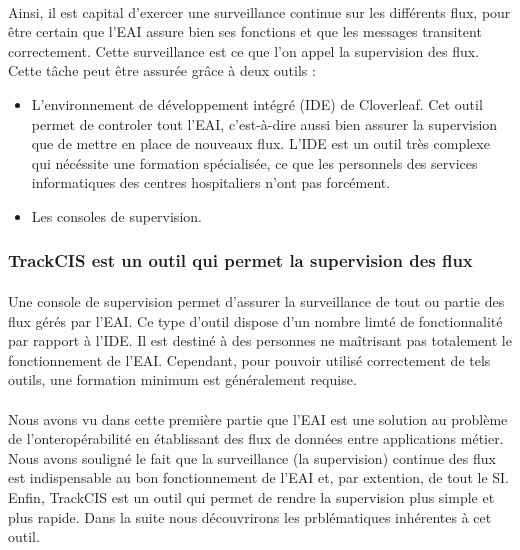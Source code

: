 			\paragraph{}%
			Ainsi, il est capital d'exercer une surveillance continue sur les différents
			flux, pour être certain que l'EAI assure bien ses fonctions et que les
			messages transitent correctement. Cette surveillance est ce que l'on appel la
			supervision des flux. Cette tâche peut être assurée grâce à deux outils :
			\begin{itemize}
			  \item L'environnement de développement intégré (IDE) de Cloverleaf. Cet
			  outil permet de controler tout l'EAI, c'est-à-dire aussi bien assurer la
			  supervision que de mettre en place de nouveaux flux. L'IDE est un outil
			  très complexe qui nécéssite une formation spécialisée, ce que les
			  personnels des services informatiques des centres hospitaliers n'ont pas
			  forcément.
			  \item Les consoles de supervision.
			\end{itemize}
			
		\subsubsection{TrackCIS est un outil qui permet la supervision des flux}
			\paragraph{}%
			Une console de supervision permet d'assurer la surveillance
			de tout ou partie des flux gérés par l'EAI. Ce type d'outil dispose d'un
			nombre limté de fonctionnalité par rapport à l'IDE. Il est destiné à des
			personnes ne maîtrisant pas totalement le fonctionnement de l'EAI. Cependant,
			pour pouvoir utilisé correctement de tels outils, une formation minimum est
			généralement requise.
			
			\paragraph{}%
			
		
		\paragraph{}%
		Nous avons vu dans cette première partie que l'EAI est une solution au
		problème de l'onteropérabilité en établissant des flux de données entre
		applications métier. Nous avons souligné le fait que la surveillance (la
		supervision) continue des flux est indispensable au bon fonctionnement de
		l'EAI et, par extention, de tout le SI. Enfin, TrackCIS est un outil qui
		permet de rendre la supervision plus simple et plus rapide.\newline
		Dans la suite nous découvrirons les prblématiques inhérentes à cet outil.
		

